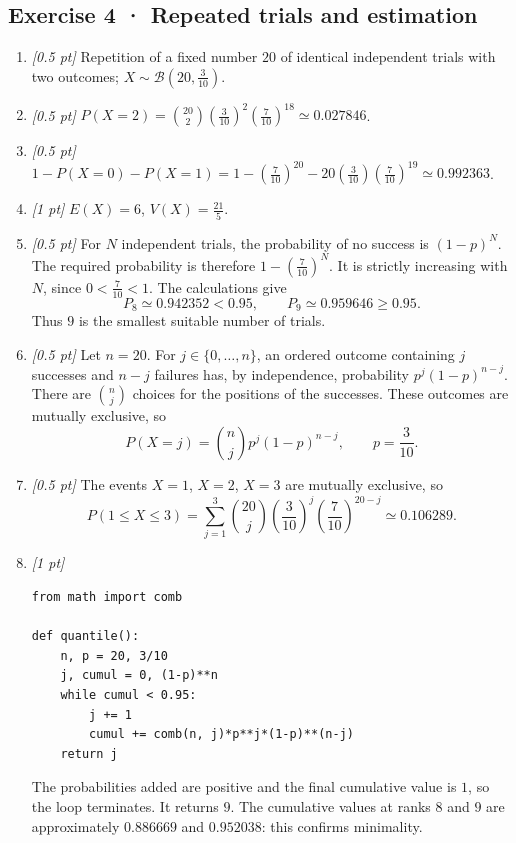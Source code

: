 \subsection*{Exercise 4 · Repeated trials and estimation}\begin{enumerate}

\item \textit{[0.5 pt]} Repetition of a fixed number $20$ of identical independent trials with two outcomes; $X\sim\mathcal B(20,\frac{3}{10})$.

\item \textit{[0.5 pt]} $P(X=2)=\binom{20}2(\frac{3}{10})^2(\frac{7}{10})^{18}\simeq0.027846$.

\item \textit{[0.5 pt]} $1-P(X=0)-P(X=1)=1-(\frac{7}{10})^{20}-20(\frac{3}{10})(\frac{7}{10})^{19}\simeq0.992363$.

\item \textit{[1 pt]} $E(X)=6$, $V(X)=\frac{21}{5}$.

\item \textit{[0.5 pt]} For $N$ independent trials, the probability of no success is $(1-p)^N$. The required probability is therefore $1-(\frac{7}{10})^N$. It is strictly increasing with $N$, since $0<\frac{7}{10}<1$. The calculations give
\[P_{8}\simeq0.942352<0.95,\qquad P_{9}\simeq0.959646\ge0.95.\]
Thus $9$ is the smallest suitable number of trials.

\item \textit{[0.5 pt]} Let $n=20$. For $j\in\{0,\ldots,n\}$, an ordered outcome containing $j$ successes and $n-j$ failures has, by independence, probability $p^j(1-p)^{n-j}$. There are $\binom nj$ choices for the positions of the successes. These outcomes are mutually exclusive, so
\[P(X=j)=\binom nj p^j(1-p)^{n-j},\qquad p=\frac{3}{10}.\]

\item \textit{[0.5 pt]} The events $X=1$, $X=2$, $X=3$ are mutually exclusive, so
\[P(1\le X\le3)=\sum_{j=1}^3\binom{20}j(\frac{3}{10})^j(\frac{7}{10})^{20-j}\simeq0.106289.\]


\item \textit{[1 pt]} 
\begin{lstlisting}
from math import comb

def quantile():
    n, p = 20, 3/10
    j, cumul = 0, (1-p)**n
    while cumul < 0.95:
        j += 1
        cumul += comb(n, j)*p**j*(1-p)**(n-j)
    return j
\end{lstlisting}
The probabilities added are positive and the final cumulative value is $1$, so the loop terminates. It returns $9$. The cumulative values at ranks $8$ and $9$ are approximately $0.886669$ and $0.952038$: this confirms minimality.

\end{enumerate}


